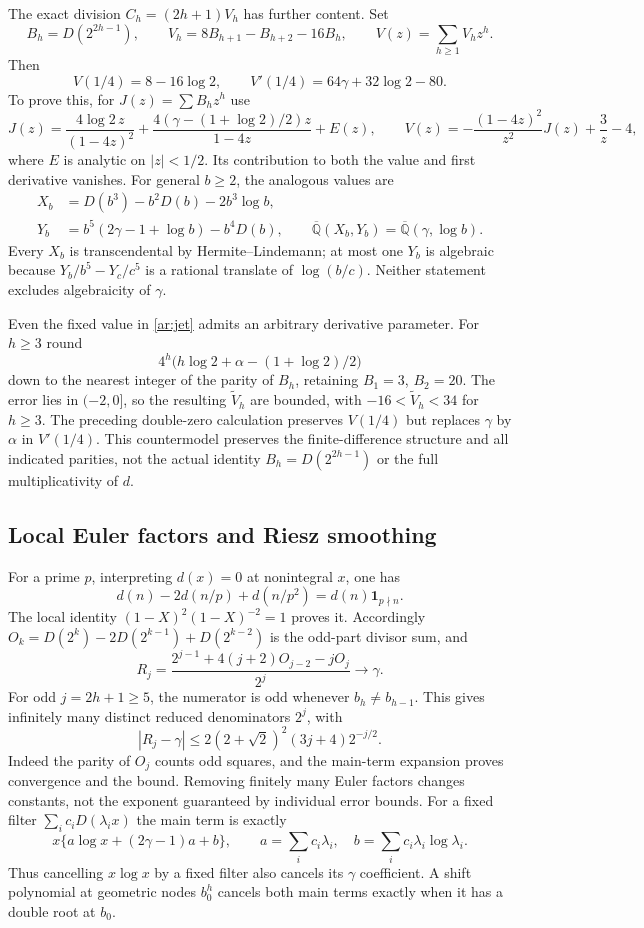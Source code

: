 \documentclass[11pt,a4paper]{article}
\newcommand{\Qbar}{\overline{\mathbb Q}}
\theoremstyle{definition}
\theoremstyle{remark}
\numberwithin{equation}{section}
\begin{document}
The exact division $C_h=(2h+1)V_h$ has further content.  Set
\[
 B_h=D(2^{2h-1}),\qquad V_h=8B_{h+1}-B_{h+2}-16B_h,
 \qquad V(z)=\sum_{h\ge1}V_hz^h.
\]
Then
\begin{equation}\label{ar:jet}
 V(1/4)=8-16\log2,\qquad
 V'(1/4)=64\gamma+32\log2-80.
\end{equation}
To prove this, for $J(z)=\sum B_hz^h$ use
\[
 J(z)=\frac{4\log2\,z}{(1-4z)^2}
 +\frac{4(\gamma-(1+\log2)/2)z}{1-4z}+E(z),
 \qquad
 V(z)=-\frac{(1-4z)^2}{z^2}J(z)+\frac3z-4,
\]
where $E$ is analytic on $|z|<1/2$.  Its contribution to both the value
and first derivative vanishes.  For general $b\ge2$, the analogous values
are
\begin{align*}
 X_b&=D(b^3)-b^2D(b)-2b^3\log b,\\
 Y_b&=b^5(2\gamma-1+\log b)-b^4D(b),
 \qquad \Qbar(X_b,Y_b)=\Qbar(\gamma,\log b).
\end{align*}
Every $X_b$ is transcendental by Hermite--Lindemann; at most one $Y_b$ is
algebraic because $Y_b/b^5-Y_c/c^5$ is a rational translate of $\log(b/c)$.
Neither statement excludes algebraicity of $\gamma$.

Even the fixed value in \eqref{ar:jet} admits an arbitrary derivative
parameter.  For $h\ge3$ round
\[
 4^h\bigl(h\log2+\alpha-(1+\log2)/2\bigr)
\]
down to the nearest integer of the parity of $B_h$, retaining $B_1=3$,
$B_2=20$.  The error lies in $(-2,0]$, so the resulting $\widetilde V_h$
are bounded, with $-16<\widetilde V_h<34$ for $h\ge3$.
The preceding double-zero calculation preserves $V(1/4)$ but replaces
$\gamma$ by $\alpha$ in $V'(1/4)$.  This countermodel preserves the
finite-difference structure and all indicated parities, not the actual
identity $B_h=D(2^{2h-1})$ or the full multiplicativity of $d$.

\subsection{Local Euler factors and Riesz smoothing}
For a prime $p$, interpreting $d(x)=0$ at nonintegral $x$, one has
\[
 d(n)-2d(n/p)+d(n/p^2)=d(n)\mathbf1_{p\nmid n}.
\]
The local identity $(1-X)^2(1-X)^{-2}=1$ proves it.  Accordingly
$O_k=D(2^k)-2D(2^{k-1})+D(2^{k-2})$ is the odd-part divisor sum, and
\[
 R_j=\frac{2^{j-1}+4(j+2)O_{j-2}-jO_j}{2^j}\longrightarrow\gamma.
\]
For odd $j=2h+1\ge5$, the numerator is odd whenever $b_h\ne b_{h-1}$.
This gives infinitely many distinct reduced denominators $2^j$, with
\[
 |R_j-\gamma|\le2(2+\sqrt2)^2(3j+4)2^{-j/2}.
\]
Indeed the parity of $O_j$ counts odd squares, and the main-term expansion
proves convergence and the bound.  Removing finitely many Euler factors
changes constants, not the exponent guaranteed by individual error bounds.
For a fixed filter $\sum_ic_iD(\lambda_ix)$ the main term is exactly
\[
 x\{a\log x+(2\gamma-1)a+b\},\qquad
 a=\sum_ic_i\lambda_i,\quad b=\sum_ic_i\lambda_i\log\lambda_i.
\]
Thus cancelling $x\log x$ by a fixed filter also cancels its $\gamma$
coefficient.  A shift polynomial at geometric nodes $b_0^h$ cancels both
main terms exactly when it has a double root at $b_0$.
\end{document}
